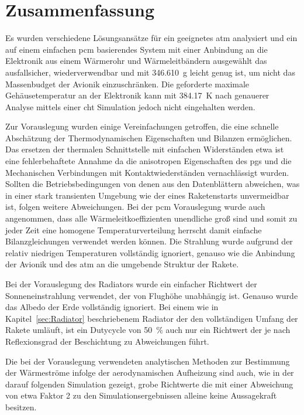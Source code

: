 \chapter{Zusammenfassung}
\label{chap:Zusammenfassung}

Es wurden verschiedene Lösungsansätze für ein geeignetes \ac{atm} analysiert und ein auf einem einfachen \ac{pcm} basierendes System
mit einer Anbindung an die Elektronik aus einem Wärmerohr und Wärmeleitbändern
ausgewählt das ausfallsicher, wiederverwendbar und mit \SI{346,610}{\gram} leicht genug ist, um nicht das Massenbudget der Avionik einzuschränken.
Die geforderte maximale Gehäusetemperatur an der Elektronik kann mit \SI{384,17}{\kelvin} nach genauerer Analyse mittels einer \ac{cht} Simulation
jedoch nicht eingehalten werden.

Zur Vorauslegung wurden einige Vereinfachungen getroffen, die eine schnelle Abschätzung der Thermodynamischen Eigenschaften
und Bilanzen ermöglichen.
Das ersetzen der thermalen Schnittstelle mit einfachen Widerständen etwa ist eine fehlerbehaftete Annahme da die anisotropen Eigenschaften des \ac{pgs} und
die Mechanischen
Verbindungen mit Kontaktwiederständen vernachlässigt wurden. Sollten die Betriebsbedingungen von denen aus den Datenblättern abweichen, was in einer
stark transienten Umgebung wie der eines Raketenstarts unvermeidbar ist, folgen weitere Abweichungen.
Bei der \ac{pcm} Vorauslegung wurde auch angenommen, dass alle Wärmeleitkoeffizienten unendliche groß sind und somit zu jeder Zeit
eine homogene Temperaturverteilung herrscht damit einfache Bilanzgleichungen verwendet werden können.
Die Strahlung wurde aufgrund der relativ niedrigen Temperaturen vollständig ignoriert, genauso wie
die Anbindung der Avionik und des \ac{atm} an die umgebende Struktur der Rakete.

Bei der Vorauslegung des Radiators wurde ein einfacher Richtwert der Sonneneinstrahlung verwendet, der von Flughöhe unabhängig ist.
Genauso wurde das Albedo der Erde vollständig ignoriert.
Bei einem wie in Kapitel~\ref{sec:Radiator} beschriebenem Radiator der den vollständigen Umfang der Rakete umläuft, ist ein Dutycycle von
\SI{50}{\percent} auch nur ein Richtwert der je nach Reflexionsgrad der Beschichtung zu Abweichungen führt.

Die bei der Vorauslegung verwendeten analytischen Methoden zur Bestimmung der Wärmeströme infolge der aerodynamischen Aufheizung sind auch,
wie in der darauf folgenden Simulation gezeigt, grobe Richtwerte die mit einer Abweichung von etwa Faktor 2 zu den Simulationsergebnissen
alleine keine Aussagekraft besitzen.

